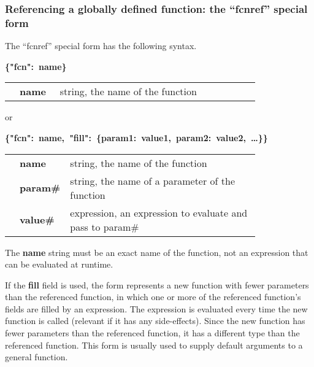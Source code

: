 \documentclass{article}
\newcommand{\PFAc}{\ttfamily\bfseries}
\theoremstyle{definition}
\begin{document}
\hypertarget{hsec:fcnref}{}
\label{form:fcnref}

\subsubsection{Referencing a globally defined function: the ``fcnref'' special form}

\begin{minipage}{\linewidth}
The ``fcnref'' special form has the following syntax.
\begin{center}
\begin{minipage}{0.9\linewidth}
\mbox{\PFAc \{"fcn":$\!$ name\} \vspace{0.2 cm} \\} \vspace{0.2 cm} \\
\rm \begin{tabular}{p{0.01\linewidth} l p{0.8\linewidth}}
& \PFAc name \rm & string, the name of the function \\
\end{tabular}
\end{minipage}
\end{center}
or
\begin{center}
\begin{minipage}{0.9\linewidth}
\mbox{\PFAc \{"fcn":$\!$ name, "fill":$\!$ \{param1:$\!$ value1, param2:$\!$ value2, \ldots\}\} \vspace{0.2 cm} \\} \vspace{0.2 cm} \\
\rm \begin{tabular}{p{0.01\linewidth} l p{0.8\linewidth}}
& \PFAc name \rm & string, the name of the function \\
& \PFAc param\# \rm & string, the name of a parameter of the function \\
& \PFAc value\# \rm & expression, an expression to evaluate and pass to param\# \\
\end{tabular}
\end{minipage}
\end{center}
\end{minipage}

The {\PFAc name} string must be an exact name of the function, not an expression that can be evaluated at runtime.

If the {\PFAc fill} field is used, the form represents a new function with fewer parameters than the referenced function, in which one or more of the referenced function's fields are filled by an expression.  The expression is evaluated every time the new function is called (relevant if it has any side-effects).  Since the new function has fewer parameters than the referenced function, it has a different type than the referenced function.  This form is usually used to supply default arguments to a general function.
\end{document}
